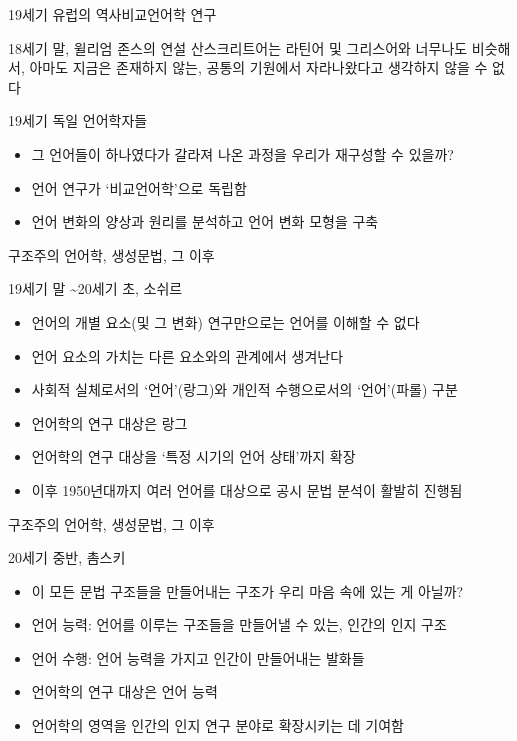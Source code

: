 \documentclass[11pt, aspectratio=169]{beamer}
\begin{document}
\begin{frame}[t]{19세기 유럽의 역사비교언어학 연구}
  \begin{block}{18세기 말, 윌리엄 존스의 연설}
    산스크리트어는 라틴어 및 그리스어와 너무나도 비슷해서, 아마도 지금은 존재하지 않는, 공통의 기원에서 자라나왔다고 생각하지 않을 수 없다
  \end{block}
  \begin{block}{19세기 독일 언어학자들}
    \begin{itemize}
      \item 그 언어들이 하나였다가 갈라져 나온 과정을 우리가 재구성할 수 있을까?
      \item 언어 연구가 ‘비교언어학’으로 독립함 
      \item 언어 변화의 양상과 원리를 분석하고 언어 변화 모형을 구축
    \end{itemize}
  \end{block}
\end{frame}

\begin{frame}[t]{구조주의 언어학, 생성문법, 그 이후}
  \begin{block}{19세기 말 \textasciitilde 20세기 초, 소쉬르}
    \begin{itemize}
      \item 언어의 개별 요소(및 그 변화) 연구만으로는 언어를 이해할 수 없다
      \item 언어 요소의 가치는 다른 요소와의 관계에서 생겨난다
      \item 사회적 실체로서의 ‘언어’(랑그)와 개인적 수행으로서의 ‘언어’(파롤) 구분
      \item 언어학의 연구 대상은 랑그
      \item 언어학의 연구 대상을 ‘특정 시기의 언어 상태’까지 확장
      \item 이후 1950년대까지 여러 언어를 대상으로 공시 문법 분석이 활발히 진행됨
    \end{itemize}
  \end{block}
\end{frame}

\begin{frame}[t]{구조주의 언어학, 생성문법, 그 이후}
  \begin{block}{20세기 중반, 촘스키}
    \begin{itemize}
      \item 이 모든 문법 구조들을 만들어내는 구조가 우리 마음 속에 있는 게 아닐까?
      \item 언어 능력: 언어를 이루는 구조들을 만들어낼 수 있는, 인간의 인지 구조
      \item 언어 수행: 언어 능력을 가지고 인간이 만들어내는 발화들
      \item 언어학의 연구 대상은 언어 능력
      \item 언어학의 영역을 인간의 인지 연구 분야로 확장시키는 데 기여함
    \end{itemize}
  \end{block}
\end{frame}
\end{document}
